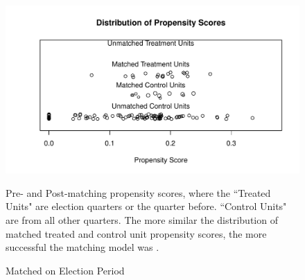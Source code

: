\documentclass[a4paper]{article}\usepackage{graphicx, color}
\makeatletter
\def\maxwidth{ %
  \ifdim\Gin@nat@width>\linewidth
    \linewidth
  \else
    \Gin@nat@width
  \fi
}
\newenvironment{knitrout}{}{} %
\makeatother
\begin{document}
\begin{figure}[h]
  \caption{Matched on Election Period}
  \label{ElectPropensityScores}
\begin{knitrout}
\color{fgcolor}\includegraphics[width=\maxwidth]{figure/ElectPropensity} 
\end{knitrout}

    \begin{singlespace}
        {\scriptsize{Pre- and Post-matching propensity scores, where the ``Treated Units" are election quarters or the quarter before. ``Control Units" are from all other quarters. The more similar the distribution of matched treated and control unit propensity scores, the more successful the matching model was \cite[17]{Hollyer2012}.}}
    \end{singlespace}
\end{figure}
\end{document}
